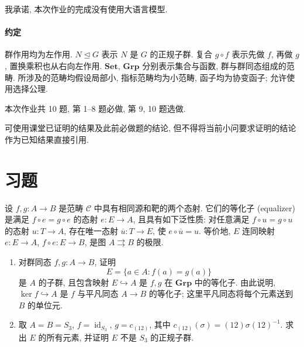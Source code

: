 \documentclass{article}
\begin{document}
{\heiti 我承诺, 本次作业的完成没有使用大语言模型.}


\paragraph{约定} 群作用均为左作用. $N\unlhd G$ 表示 $N$ 是 $G$ 的正规子群. 复合 $g\circ f$ 表示先做 $f$, 再做 $g$, 置换乘积也从右向左作用. $\mathbf{Set}$, $\mathbf{Grp}$ 分别表示集合与函数, 群与群同态组成的范畴. 所涉及的范畴均假设局部小, 指标范畴均为小范畴, 函子均为协变函子; 允许使用选择公理.

本次作业共 10 题, 第 1--8 题必做, 第 9, 10 题选做.

可使用课堂已证明的结果及此前必做题的结论, 但不得将当前小问要求证明的结论作为已知结果直接引用.

\section*{习题}

\begin{problem}
设 $f,g:A\to B$ 是范畴 $\mathcal C$ 中具有相同源和靶的两个态射. 它们的等化子 (equalizer) 是满足 $f\circ e=g\circ e$ 的态射 $e:E\to A$, 且具有如下泛性质: 对任意满足 $f\circ u=g\circ u$ 的态射 $u:T\to A$, 存在唯一态射 $\overline u:T\to E$, 使 $e\circ\overline u=u$. 等价地, $E$ 连同映射 $e:E\to A$, $f\circ e:E\to B$, 是图 $A\rightrightarrows B$ 的极限.
\begin{enumerate}
  \item[(a)] 对群同态 $f,g:A\to B$, 证明
  \[
    E=\{a\in A:f(a)=g(a)\}
  \]
  是 $A$ 的子群, 且包含映射 $E\hookrightarrow A$ 是 $f,g$ 在 $\mathbf{Grp}$ 中的等化子. 由此说明, $\ker f\hookrightarrow A$ 是 $f$ 与平凡同态 $A\to B$ 的等化子; 这里平凡同态将每个元素送到 $B$ 的单位元.
  \item[(b)] 取 $A=B=S_3$, $f=\operatorname{id}_{S_3}$, $g=c_{(12)}$, 其中 $c_{(12)}(\sigma)=(12)\sigma(12)^{-1}$. 求出 $E$ 的所有元素, 并证明 $E$ 不是 $S_3$ 的正规子群.
\end{enumerate}
\end{problem}
\end{document}
